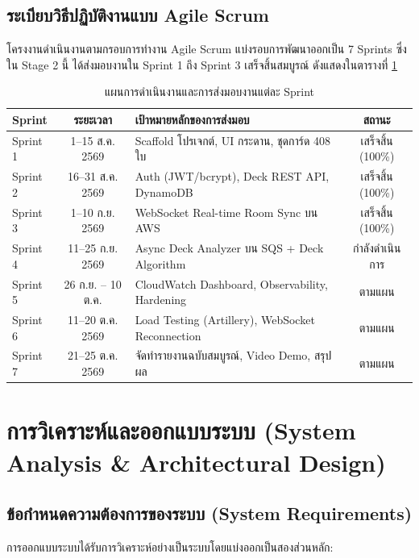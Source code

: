 \documentclass[12pt,a4paper]{report}
\begin{document}
\section{ระเบียบวิธีปฏิบัติงานแบบ Agile Scrum}
โครงงานดำเนินงานตามกรอบการทำงาน Agile Scrum แบ่งรอบการพัฒนาออกเป็น 7 Sprints ซึ่งใน Stage 2 นี้ ได้ส่งมอบงานใน Sprint 1 ถึง Sprint 3 เสร็จสิ้นสมบูรณ์ ดังแสดงในตารางที่ \ref{tab:sprint_plan}

\begin{table}[H]
\centering
\caption{แผนการดำเนินงานและการส่งมอบงานแต่ละ Sprint}
\label{tab:sprint_plan}
\begin{tabularx}{\textwidth}{lcp{6.5cm}c}
\toprule
\textbf{Sprint} & \textbf{ระยะเวลา} & \textbf{เป้าหมายหลักของการส่งมอบ} & \textbf{สถานะ} \\
\midrule
Sprint 1 & 1–15 ส.ค. 2569 & Scaffold โปรเจกต์, UI กระดาน, ชุดการ์ด 408 ใบ & เสร็จสิ้น (100\%) \\
Sprint 2 & 16–31 ส.ค. 2569 & Auth (JWT/bcrypt), Deck REST API, DynamoDB & เสร็จสิ้น (100\%) \\
Sprint 3 & 1–10 ก.ย. 2569 & WebSocket Real-time Room Sync บน AWS & เสร็จสิ้น (100\%) \\
Sprint 4 & 11–25 ก.ย. 2569 & Async Deck Analyzer บน SQS + Deck Algorithm & กำลังดำเนินการ \\
Sprint 5 & 26 ก.ย. – 10 ต.ค. & CloudWatch Dashboard, Observability, Hardening & ตามแผน \\
Sprint 6 & 11–20 ต.ค. 2569 & Load Testing (Artillery), WebSocket Reconnection & ตามแผน \\
Sprint 7 & 21–25 ต.ค. 2569 & จัดทำรายงานฉบับสมบูรณ์, Video Demo, สรุปผล & ตามแผน \\
\bottomrule
\end{tabularx}
\end{table}

\chapter{การวิเคราะห์และออกแบบระบบ (System Analysis \& Architectural Design)}

\section{ข้อกำหนดความต้องการของระบบ (System Requirements)}
การออกแบบระบบได้รับการวิเคราะห์อย่างเป็นระบบโดยแบ่งออกเป็นสองส่วนหลัก:
\end{document}
